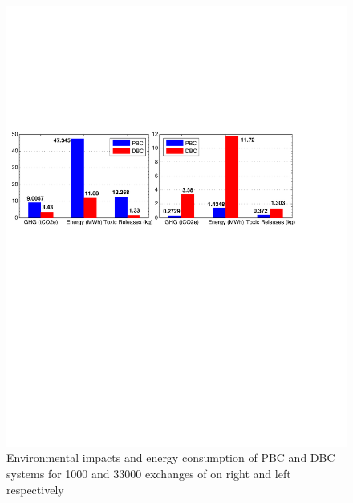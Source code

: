 \documentclass[3p,times,procedia]{elsarticle}
\begin{document}
\begin{figure}[t]
\includegraphics[width=\linewidth]{sf.pdf}
\caption{Environmental impacts and energy consumption of PBC and DBC systems for 1000 and 33000 exchanges of on right and left respectively}
\label{screen1}
\endminipage\hfill
{}

\end{figure}
\end{document}
